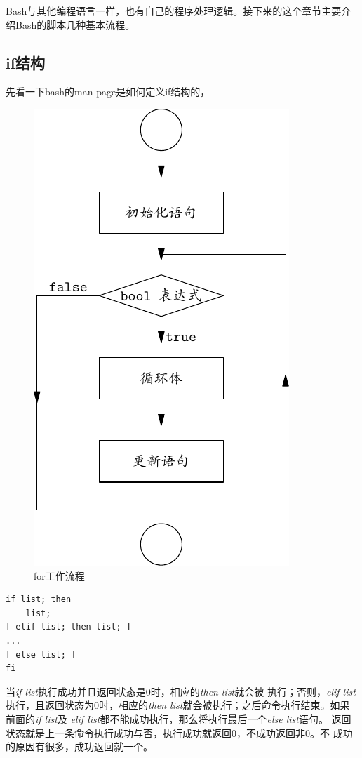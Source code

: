 Bash与其他编程语言一样，也有自己的程序处理逻辑。接下来的这个章节主要介
绍Bash的脚本几种基本流程。

\subsection{if结构}

先看一下bash的man page是如何定义if结构的，

\begin{figure}[!htbp]
  \centering
  \includegraphics{graph/for.pdf}
    \caption{for工作流程}
  \label{fig:for_workflow}
\end{figure}

\begin{verbatim}
if list; then 
    list; 
[ elif list; then list; ] 
... 
[ else list; ] 
fi
\end{verbatim}

当\emph{if list}执行成功并且返回状态是0时，相应的\emph{then list}就会被
执行；否则，\emph{elif list}执行，且返回状态为0时，相应的\emph{then
  list}就会被执行；之后命令执行结束。如果前面的\emph{if list}及
\emph{elif list}都不能成功执行，那么将执行最后一个\emph{else list}语句。
返回状态就是上一条命令执行成功与否，执行成功就返回0，不成功返回非0。不
成功的原因有很多，成功返回就一个。

